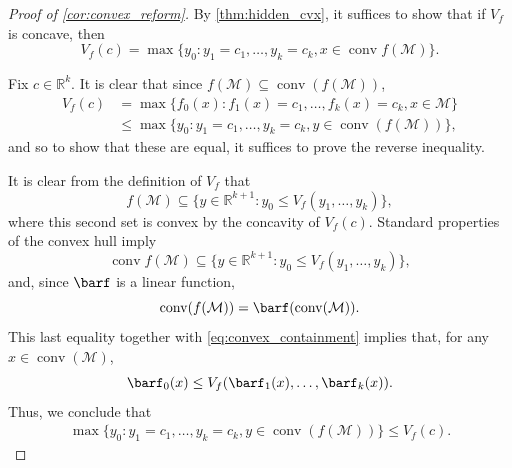 \documentclass{article}
\numberwithin{equation}{section}
\newcommand{\R}{\mathbb{R}}
\DeclareMathOperator*{\conv}{conv}
\newcommand{\cM}{{\mathcal{M}}}
\begin{document}
\begin{proof}[Proof of \cref{cor:convex_reform}]
By \cref{thm:hidden_cvx}, it suffices to show that if $V_f$ is concave, then 
\[
    V_f(c) = \max \{y_0 : y_1 = c_1, \dots, y_k = c_k, x \in \conv f(\cM)\}.
\]

    Fix $c \in \R^k$.
    It is clear that since $f(\cM) \subseteq \conv(f(\cM))$, 
    \begin{align*}
        V_f(c) &= \max \{f_0(x) : f_1(x) = c_1, \dots, f_k(x) = c_k, x \in \cM\}\\
        &\le
        \max \{y_0 : y_1 = c_1, \dots, y_k = c_k, y \in \conv(f(\cM))\},
    \end{align*}
    and so to show that these are equal, it suffices to prove the reverse inequality.

    It is clear from the definition of $V_f$ that
    \[
        f(\cM) \subseteq \{y \in \R^{k+1}: y_0 \le V_f(y_1, \dots, y_k)\},
    \]
    where this second set is convex by the concavity of $V_f(c)$.
    Standard properties of the convex hull imply
    \begin{equation}
    \label{eq:convex_containment}
        \conv f(\cM) \subseteq \{y \in \R^{k+1}: y_0 \le V_f(y_1, \dots, y_k)\},
    \end{equation}
    and, since $\barf$ is a linear function,
    \[
        \conv(f(\cM)) = \barf(\conv(\cM)).
    \]
    This last equality together with \eqref{eq:convex_containment} implies that, for any $x \in \conv(\cM)$,
    \[
        \barf_0(x) \le V_f(\barf_1(x), \dots, \barf_k(x)).
    \]
    Thus, we conclude that
    \begin{align*}
        \max \{y_0 : y_1 = c_1, \dots, y_k = c_k, y \in \conv(f(\cM))\} \le
        V_f(c).
    \end{align*}

\end{proof}
\end{document}
